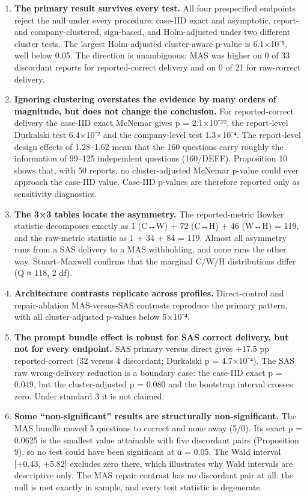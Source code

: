 \documentclass[letterpaper]{article}
\providecommand{\tightlist}{}
\begin{document}
\begin{enumerate}
\def\labelenumi{\arabic{enumi}.}
\tightlist
\item
  \textbf{The primary result survives every test.} All four prespecified endpoints reject the null under every procedure: case-IID exact and asymptotic, report- and company-clustered, sign-based, and Holm-adjusted under two different cluster tests. The largest Holm-adjusted cluster-aware p-value is 6.1×10⁻⁵, well below 0.05. The direction is unambiguous: MAS was higher on 0 of 33 discordant reports for reported-correct delivery and on 0 of 21 for raw-correct delivery.
\item
  \textbf{Ignoring clustering overstates the evidence by many orders of magnitude, but does not change the conclusion.} For reported-correct delivery the case-IID exact McNemar gives p = 2.1×10⁻²², the report-level Durkalski test 6.4×10⁻⁷ and the company-level test 1.3×10⁻⁴. The report-level design effects of 1.28--1.62 mean that the 160 questions carry roughly the information of 99--125 independent questions (160/DEFF). Proposition 10 shows that, with 50 reports, no cluster-adjusted McNemar p-value could ever approach the case-IID value. Case-IID p-values are therefore reported only as sensitivity diagnostics.
\item
  \textbf{The 3×3 tables locate the asymmetry.} The reported-metric Bowker statistic decomposes exactly as 1 (C↔W) + 72 (C↔H) + 46 (W↔H) = 119, and the raw-metric statistic as 1 + 34 + 84 = 119. Almost all asymmetry runs from a SAS delivery to a MAS withholding, and none runs the other way. Stuart--Maxwell confirms that the marginal C/W/H distributions differ (Q ≈ 118, 2 df).
\item
  \textbf{Architecture contrasts replicate across profiles.} Direct-control and repair-ablation MAS-versus-SAS contrasts reproduce the primary pattern, with all cluster-adjusted p-values below 5×10⁻⁴.
\item
  \textbf{The prompt bundle effect is robust for SAS correct delivery, but not for every endpoint.} SAS primary versus direct gives +17.5 pp reported-correct (32 versus 4 discordant; Durkalski p = 4.7×10⁻⁴). The SAS raw wrong-delivery reduction is a boundary case: the case-IID exact p = 0.049, but the cluster-adjusted p = 0.080 and the bootstrap interval crosses zero. Under standard 3 it is not claimed.
\item
  \textbf{Some ``non-significant'' results are structurally non-significant.} The MAS bundle moved 5 questions to correct and none away (5/0). Its exact p = 0.0625 is the smallest value attainable with five discordant pairs (Proposition 9), so no test could have been significant at α = 0.05. The Wald interval {[}+0.43, +5.82{]} excludes zero there, which illustrates why Wald intervals are descriptive only. The MAS repair contrast has no discordant pair at all: the null is met exactly in sample, and every test statistic is degenerate.

\end{enumerate}
\end{document}
